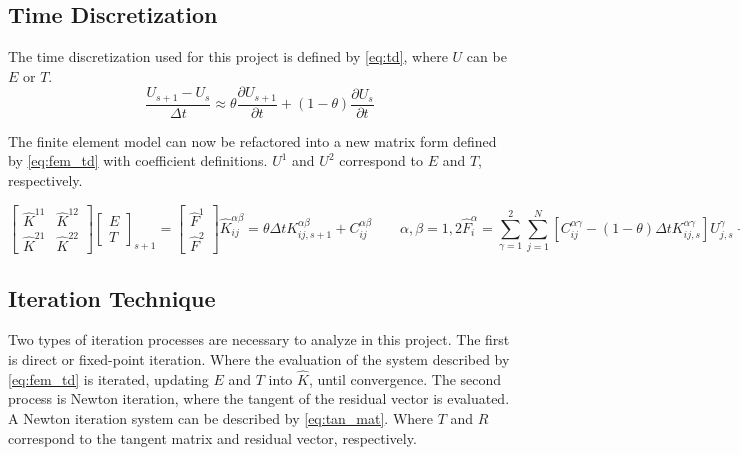 \documentclass[11pt]{scrartcl}
\newcommand{\be}{\begin{equation}}
\newcommand{\ee}{\end{equation}}
\begin{document}
\subsection{\bf Time Discretization}

The time discretization used for this project is defined by \eqref{eq:td}, where $U$ can be $E$ or $T$.
\be
\frac{U_{s+1}-U_s}{\Delta t} \approx \theta\frac{\partial U_{s+1}}{\partial t} + (1-\theta)\frac{\partial U_{s}}{\partial t}
\label{eq:td}
\ee

The finite element model can now be refactored into a new matrix form defined by \eqref{eq:fem_td} with coefficient definitions.  $U^1$ and $U^2$ correspond to $E$ and $T$, respectively.

\begin{subequations}

\be
\begin{bmatrix} \hat{K}^{11} & \hat{K}^{12} \\ \hat{K}^{21} & \hat{K}^{22} \end{bmatrix}
\begin{bmatrix} E \\ T \end{bmatrix}_{s+1} =
\begin{bmatrix} \hat{F}^1 \\ \hat{F}^2 \end{bmatrix}
\ee
\be 
\hat{K}^{\alpha\beta}_{ij} = \theta\Delta t K^{\alpha\beta}_{ij,s+1} + C^{\alpha\beta}_{ij} \qquad \alpha,\beta = 1,2
\ee
\be 
\hat{F}^{\alpha}_{i} = \sum_{\gamma=1}^2\sum_{j=1}^N\left[C^{\alpha\gamma}_{ij}-(1-\theta)\Delta tK^{\alpha\gamma}_{ij,s}\right]U^{\gamma}_{j,s} + \Delta t \left[\theta F^{\alpha}_{i,s+1}+(1-\theta)F^{\alpha}_{i,s}\right] \qquad \alpha=1,2
\ee

\label{eq:fem_td}
\end{subequations}

\subsection{\bf Iteration Technique}

Two types of iteration processes are necessary to analyze in this project. The first is direct or fixed-point iteration. Where the evaluation of the system described by \eqref{eq:fem_td} is iterated, updating $E$ and $T$ into $\hat{K}$, until convergence.  The second process is Newton iteration, where the tangent of the residual vector is evaluated.  A Newton iteration system can be described by \eqref{eq:tan_mat}. Where $T$ and $R$ correspond to the tangent matrix and residual vector, respectively.
\end{document}
